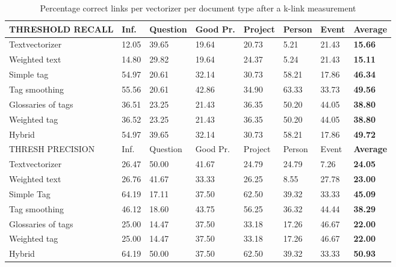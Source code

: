 \begin{table}
\begin{tabular}{| l | l | l | l | l | l | l | l |}
\hline
THRESHOLD RECALL & Inf. &  Question &  Good Pr.& Project & Person &  Event & {\bf Average} \\
\hline
Textvectorizer & 12.05 & 39.65 & 19.64 & 20.73 & 5.21 & 21.43 & {\bf 15.66}\\
Weighted text & 14.80 & 29.82 & 19.64 & 24.37 & 5.24 & 21.43 & {\bf 15.11}\\
Simple tag & 54.97 & 20.61 & 32.14 & 30.73 & 58.21 & 17.86 & {\bf 46.34}\\
Tag smoothing & 55.56 & 20.61 & 42.86 & 34.90 & 63.33 & 33.73 & {\bf 49.56}\\
Glossaries of tags & 36.51 & 23.25 & 21.43 & 36.35 & 50.20 & 44.05 & {\bf 38.80}\\
Weighted tag & 36.52 & 23.25 & 21.43 & 36.35 & 50.20 & 44.05 & {\bf 38.80}\\
Hybrid & 54.97 & 39.65 & 32.14 & 30.73 & 58.21 & 17.86 & {\bf 49.72}\\
\hline

\hline
THRESH PRECISION & Inf. &  Question &  Good Pr.& Project & Person &  Event & {\bf Average} \\
\hline
Textvectorizer & 26.47 & 50.00 & 41.67 & 24.79 & 24.79 & 7.26 & {\bf 24.05}\\
Weighted text & 26.76 & 41.67 & 33.33 & 26.25 & 8.55 & 27.78 & {\bf 23.00}\\
Simple Tag & 64.19 & 17.11 & 37.50 & 62.50 & 39.32 & 33.33 & {\bf 45.09}\\
Tag smoothing & 46.12 & 18.60 & 43.75 & 56.25 & 36.32 & 44.44 & {\bf 38.29}\\
Glossaries of tags & 25.00 & 14.47 & 37.50 & 33.18 & 17.26 & 46.67 & {\bf 22.00}\\
Weighted tag & 25.00 & 14.47 & 37.50 & 33.18 & 17.26 & 46.67 & {\bf 22.00}\\
Hybrid & 64.19 & 50.00 & 37.50 & 62.50 & 39.32 & 33.33 & {\bf 50.93}\\
\hline
\end{tabular}

\caption{Percentage correct links per vectorizer per document type after a k-link measurement}
\label{tab:thresh_eval}
\end{table}

